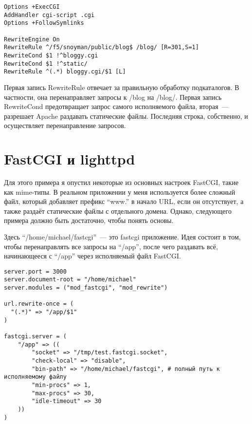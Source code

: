 \begin{lstlisting}
Options +ExecCGI
AddHandler cgi-script .cgi
Options +FollowSymlinks

RewriteEngine On
RewriteRule ^/f5/snoyman/public/blog$ /blog/ [R=301,S=1]
RewriteCond $1 !^bloggy.cgi
RewriteCond $1 !^static/
RewriteRule ^(.*) bloggy.cgi/$1 [L]
\end{lstlisting}
%

Первая запись RewriteRule отвечает за правильную обработку подкаталогов. В частности, она перенаправляет запросы к /blog на /blog/. Первая запись RewriteCond предотвращает запрос самого исполняемого файла, вторая~--- разрешает Apache раздавать статические файлы. Последняя строка, собственно, и осуществляет перенаправление запросов.
%

\section{FastCGI и lighttpd}
%
%

Для этого примера я опустил некоторые из основных настроек FastCGI, такие как mime-типы. В реальном приложении у меня используется более сложный файл, который добавляет префикс ``www.'' в начало URL, если он отсутствует, а также раздаёт статические файлы с отдельного домена. Однако, следующего примера должно быть достаточно, чтобы понять основы.

Здесь ``/home/michael/fastcgi''~--- это fastcgi приложение. Идея состоит в том, чтобы перенаправлять все запросы на ``/app'', после чего раздавать всё, начинающееся с ``/app'' через исполняемый файл FastCGI.
%

\begin{lstlisting}
server.port = 3000
server.document-root = "/home/michael"
server.modules = ("mod_fastcgi", "mod_rewrite")

url.rewrite-once = (
  "(.*)" => "/app/$1"
)

fastcgi.server = (
    "/app" => ((
        "socket" => "/tmp/test.fastcgi.socket",
        "check-local" => "disable",
        "bin-path" => "/home/michael/fastcgi", # полный путь к исполняемому файлу
        "min-procs" => 1,
        "max-procs" => 30,
        "idle-timeout" => 30
    ))
)
\end{lstlisting}%


